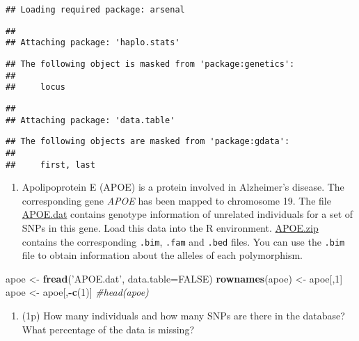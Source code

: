 \documentclass[
]{article}
\newenvironment{Shaded}{\begin{snugshade}}{\end{snugshade}}
\newcommand{\CommentTok}[1]{\textcolor[rgb]{0.56,0.35,0.01}{\textit{#1}}}
\newcommand{\DataTypeTok}[1]{\textcolor[rgb]{0.13,0.29,0.53}{#1}}
\newcommand{\DecValTok}[1]{\textcolor[rgb]{0.00,0.00,0.81}{#1}}
\newcommand{\KeywordTok}[1]{\textcolor[rgb]{0.13,0.29,0.53}{\textbf{#1}}}
\newcommand{\NormalTok}[1]{#1}
\newcommand{\OperatorTok}[1]{\textcolor[rgb]{0.81,0.36,0.00}{\textbf{#1}}}
\newcommand{\OtherTok}[1]{\textcolor[rgb]{0.56,0.35,0.01}{#1}}
\newcommand{\StringTok}[1]{\textcolor[rgb]{0.31,0.60,0.02}{#1}}
\providecommand{\tightlist}{%
  \setlength{\itemsep}{0pt}\setlength{\parskip}{0pt}}
\begin{document}
\begin{verbatim}
## Loading required package: arsenal
\end{verbatim}

\begin{verbatim}
## 
## Attaching package: 'haplo.stats'
\end{verbatim}

\begin{verbatim}
## The following object is masked from 'package:genetics':
## 
##     locus
\end{verbatim}

\begin{verbatim}
## 
## Attaching package: 'data.table'
\end{verbatim}

\begin{verbatim}
## The following objects are masked from 'package:gdata':
## 
##     first, last
\end{verbatim}

\begin{enumerate}
\def\labelenumi{\arabic{enumi}.}
\tightlist
\item
  Apolipoprotein E (APOE) is a protein involved in Alzheimer's disease.
  The corresponding gene \emph{APOE} has been mapped to chromosome 19.
  The file \href{http://www-eio.upc.es/~jan/data/bsg/APOE.dat}{APOE.dat}
  contains genotype information of unrelated individuals for a set of
  SNPs in this gene. Load this data into the R environment.
  \href{http://www-eio.upc.es/~jan/data/bsg/APOE.zip}{APOE.zip} contains
  the corresponding \texttt{.bim}, \texttt{.fam} and \texttt{.bed}
  files. You can use the \texttt{.bim} file to obtain information about
  the alleles of each polymorphism.
\end{enumerate}

\begin{Shaded}
\begin{Highlighting}[]
\NormalTok{apoe <-}\StringTok{ }\KeywordTok{fread}\NormalTok{(}\StringTok{'APOE.dat'}\NormalTok{, }\DataTypeTok{data.table=}\OtherTok{FALSE}\NormalTok{)}
\KeywordTok{rownames}\NormalTok{(apoe) <-}\StringTok{ }\NormalTok{apoe[,}\DecValTok{1}\NormalTok{]}
\NormalTok{apoe <-}\StringTok{ }\NormalTok{apoe[,}\OperatorTok{-}\KeywordTok{c}\NormalTok{(}\DecValTok{1}\NormalTok{)]}
\CommentTok{#head(apoe)}
\end{Highlighting}
\end{Shaded}

\begin{enumerate}
\def\labelenumi{\arabic{enumi}.}
\setcounter{enumi}{1}
\tightlist
\item
  (1p) How many individuals and how many SNPs are there in the database?
  What percentage of the data is missing?
\end{enumerate}
\end{document}
